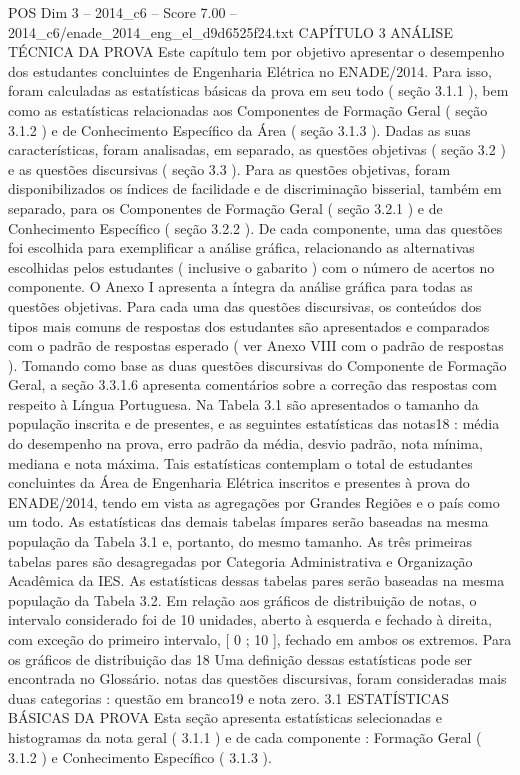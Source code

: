 \begin{textsample}{POS Dim 3 – 2014\_c6 – Score 7.00 – 2014\_c6/enade\_2014\_eng\_el\_d9d6525f24.txt}  \label{ex:f3_pos_032}
CAPÍTULO 3 ANÁLISE TÉCNICA DA PROVA Este capítulo tem por objetivo apresentar o desempenho dos estudantes concluintes de Engenharia Elétrica no ENADE/2014.
Para isso, foram calculadas as estatísticas básicas da prova em seu todo ( seção 3.1.1 ), bem como as estatísticas relacionadas aos Componentes de Formação Geral ( seção 3.1.2 ) e de Conhecimento Específico da Área ( seção 3.1.3 ).
Dadas as suas características, foram analisadas, em separado, as questões objetivas ( seção 3.2 ) e as questões discursivas ( seção 3.3 ).
Para as questões objetivas, foram disponibilizados os índices de facilidade e de discriminação bisserial, também em separado, para os Componentes de Formação Geral ( seção 3.2.1 ) e de Conhecimento Específico ( seção 3.2.2 ).
De cada componente, uma das questões foi escolhida para exemplificar a análise gráfica, relacionando as alternativas escolhidas pelos estudantes ( inclusive o gabarito ) com o número de acertos no componente.
O Anexo I apresenta a íntegra da análise gráfica para todas as questões objetivas.
Para cada uma das questões discursivas, os conteúdos dos tipos mais comuns de respostas dos estudantes são apresentados e comparados com o padrão de respostas esperado ( ver Anexo VIII com o padrão de respostas ).
Tomando como base as duas questões discursivas do Componente de Formação Geral, a seção 3.3.1.6 apresenta comentários sobre a correção das respostas com respeito à Língua Portuguesa.
Na Tabela 3.1 são apresentados o tamanho da população inscrita e de presentes, e as seguintes estatísticas das notas18 : média do desempenho na prova, erro padrão da média, desvio padrão, nota mínima, mediana e nota máxima.
Tais estatísticas contemplam o total de estudantes concluintes da Área de Engenharia Elétrica inscritos e presentes à prova do ENADE/2014, tendo em vista as agregações por Grandes Regiões e o país como um todo.
As estatísticas das demais tabelas ímpares serão baseadas na mesma população da Tabela 3.1 e, portanto, do mesmo tamanho.
As três primeiras tabelas pares são desagregadas por Categoria Administrativa e Organização Acadêmica da IES.
As estatísticas dessas tabelas pares serão baseadas na mesma população da Tabela 3.2.
Em relação aos gráficos de distribuição de notas, o intervalo considerado foi de 10 unidades, aberto à esquerda e fechado à direita, com exceção do primeiro intervalo, [ 0 ; 10 ], fechado em ambos os extremos.
Para os gráficos de distribuição das 18 Uma definição dessas estatísticas pode ser encontrada no Glossário. notas das questões discursivas, foram consideradas mais duas categorias : questão em branco19 e nota zero. 3.1 ESTATÍSTICAS BÁSICAS DA PROVA Esta seção apresenta estatísticas selecionadas e histogramas da nota geral ( 3.1.1 ) e de cada componente : Formação Geral ( 3.1.2 ) e Conhecimento Específico ( 3.1.3 ).

\end{textsample}
